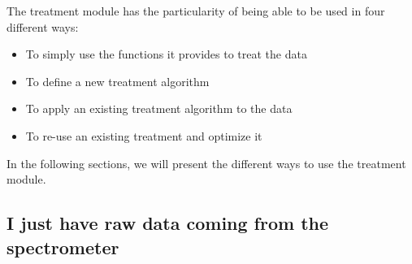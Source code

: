 The treatment module has the particularity of being able to be used in four different ways:
\begin{itemize}
    \item To simply use the functions it provides to treat the data
    \item To define a new treatment algorithm
    \item To apply an existing treatment algorithm to the data
    \item To re-use an existing treatment and optimize it
\end{itemize}

In the following sections, we will present the different ways to use the treatment module.

\subsection{I just have raw data coming from the spectrometer}